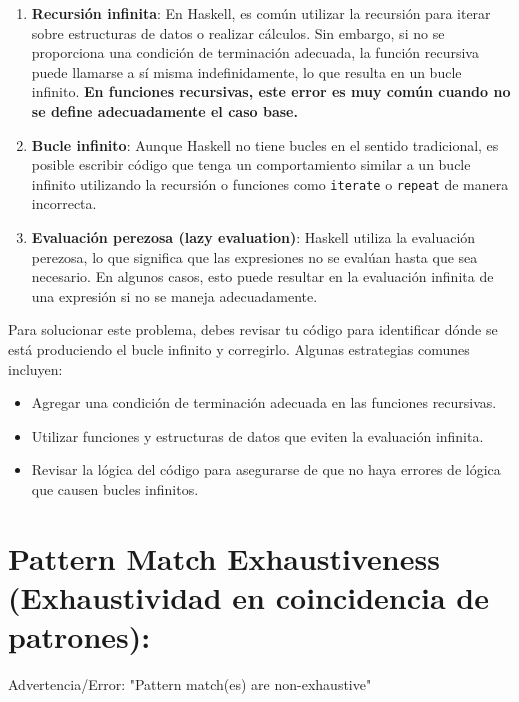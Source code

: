 \documentclass{article}
\begin{document}
\begin{enumerate}
    \item \textbf{Recursión infinita}: En Haskell, es común utilizar la recursión para iterar sobre estructuras de datos o realizar cálculos. Sin embargo, si no se proporciona una condición de terminación adecuada, la función recursiva puede llamarse a sí misma indefinidamente, lo que resulta en un bucle infinito. \textbf{En funciones recursivas, este error es muy común cuando no se define adecuadamente el caso base.}
    
    \item \textbf{Bucle infinito}: Aunque Haskell no tiene bucles en el sentido tradicional, es posible escribir código que tenga un comportamiento similar a un bucle infinito utilizando la recursión o funciones como \texttt{iterate} o \texttt{repeat} de manera incorrecta.
    
    \item \textbf{Evaluación perezosa (lazy evaluation)}: Haskell utiliza la evaluación perezosa, lo que significa que las expresiones no se evalúan hasta que sea necesario. En algunos casos, esto puede resultar en la evaluación infinita de una expresión si no se maneja adecuadamente.
\end{enumerate}

Para solucionar este problema, debes revisar tu código para identificar dónde se está produciendo el bucle infinito y corregirlo. Algunas estrategias comunes incluyen:

\begin{itemize}
    \item Agregar una condición de terminación adecuada en las funciones recursivas.
    \item Utilizar funciones y estructuras de datos que eviten la evaluación infinita.
    \item Revisar la lógica del código para asegurarse de que no haya errores de lógica que causen bucles infinitos.
\end{itemize}

\newpage
\section{Pattern Match Exhaustiveness (Exhaustividad en coincidencia de patrones):}

\begin{mdframed}[backgroundcolor=red!40,shadow=true,shadowsize=2pt,roundcorner=2pt]
    Advertencia/Error: "Pattern match(es) are non-exhaustive"
\end{mdframed}
\end{document}

